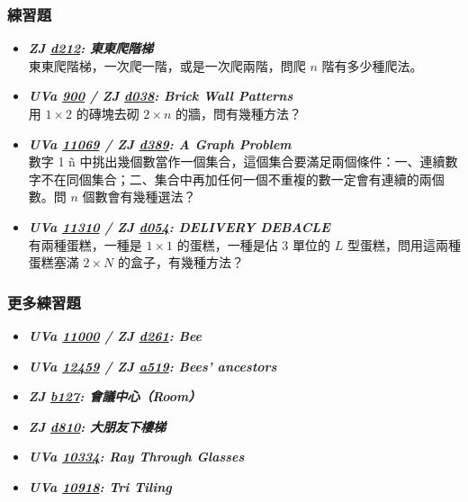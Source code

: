 \subsubsection*{練習題}
\begin{itemize}[label={\Checkmark}]
\item \textbf{\textit{ZJ \href{http://zerojudge.tw/ShowProblem?problemid=d212}{d212}: 東東爬階梯}}\\
東東爬階梯，一次爬一階，或是一次爬兩階，問爬 $n$ 階有多少種爬法。
\item \textbf{\textit{UVa \href{http://uva.onlinejudge.org/external/9/900.html}{900} / ZJ \href{http://zerojudge.tw/ShowProblem?problemid=d038}{d038}: Brick Wall Patterns}}\\
用 $1\times{2}$ 的磚塊去砌 $2\times{n}$ 的牆，問有幾種方法？
\item \textbf{\textit{UVa \href{http://uva.onlinejudge.org/external/110/11069.html}{11069} / ZJ \href{http://zerojudge.tw/ShowProblem?problemid=d389}{d389}: A Graph Problem}}\\
數字 1 \~ n 中挑出幾個數當作一個集合，這個集合要滿足兩個條件：一、連續數字不在同個集合；二、集合中再加任何一個不重複的數一定會有連續的兩個數。問 $n$ 個數會有幾種選法？
\item \textbf{\textit{UVa \href{http://uva.onlinejudge.org/external/113/11310.html}{11310} / ZJ \href{http://zerojudge.tw/ShowProblem?problemid=d054}{d054}: DELIVERY DEBACLE}}\\
有兩種蛋糕，一種是 $1\times{1}$ 的蛋糕，一種是佔 $3$ 單位的 $L$ 型蛋糕，問用這兩種蛋糕塞滿 $2\times{N}$ 的盒子，有幾種方法？
\end{itemize}
\subsubsection*{更多練習題}
\begin{itemize}[label={\PencilLeftDown}]
\item \textbf{\textit{UVa \href{http://uva.onlinejudge.org/external/110/11000.html}{11000} / ZJ \href{http://zerojudge.tw/ShowProblem?problemid=d261}{d261}: Bee}}
\item \textbf{\textit{UVa \href{http://uva.onlinejudge.org/external/124/12459.html}{12459} / ZJ \href{http://zerojudge.tw/ShowProblem?problemid=a519}{a519}: Bees' ancestors}}
\item \textbf{\textit{ZJ \href{http://zerojudge.tw/ShowProblem?problemid=b127}{b127}: 會議中心（Room）}}
\item \textbf{\textit{ZJ \href{http://zerojudge.tw/ShowProblem?problemid=d810}{d810}: 大朋友下樓梯}}
\item \textbf{\textit{UVa \href{http://uva.onlinejudge.org/external/103/10334.html}{10334}: Ray Through Glasses}}
\item \textbf{\textit{UVa \href{http://uva.onlinejudge.org/external/109/10918.html}{10918}: Tri Tiling}}
\end{itemize}